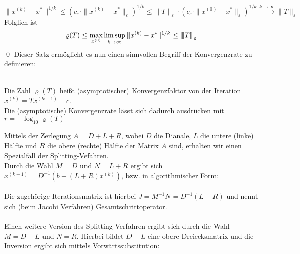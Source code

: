 \documentclass{article}
\begin{document}
\[\|x^{(k)}-x^*\|^{1/k}\leq\left(c_\varepsilon\cdot\|x^{(k)}-x^*\|_\varepsilon\right)^{1/k}
\leq \|T\|_\varepsilon\cdot\left(c_\varepsilon\cdot\|x^{(0)}-x^*\|_\varepsilon\right)^{1/k}
\xrightarrow{k\rightarrow\infty} \|T\|_\varepsilon\]
Folglich ist 
\[\varrho(T) \le \max_{x^{(0)}} \limsup_{k\rightarrow \infty} \|x^{(k)}-x^*\|^{1/k}\le {\left\vert\kern-0.25ex\left\vert\kern-0.25ex\left\vert T \right\vert\kern-0.25ex\right\vert\kern-0.25ex\right\vert}_\varepsilon\]
\qed
Dieser Satz ermöglicht es nun einen sinnvollen Begriff der Konvergenzrate zu definieren:
\begin{defbox} \\
    Die Zahl $\varrho(T)$ heißt (asymptotischer) Konvergenzfaktor von der Iteration $x^{(k)}=Tx^{(k-1)}+c$. \\
    Die (asymptotische) Konvergenzrate lässt sich dadurch ausdrücken mit $r=-\log_{10}\varrho(T)$
\end{defbox}
Mittels der Zerlegung $A=D+L+R$, wobei $D$ die Dianale, $L$ die untere (linke) Hälfte 
und $R$ die obere (rechte) Hälfte der Matrix $A$ sind, erhalten wir einen Spezialfall der Splitting-Vefahren. \\
Durch die Wahl $M=D$ und $N=L+R$ ergibt sich $x^{(k+1)}=D^{-1}(b - (L+R)x^{(k)})$, bzw. in algorithmischer Form:\\ \\
Die zugehörige Iterationsmatrix ist hierbei $J=M^{-1}N = D^{-1}(L+R)$ 
und nennt sich (beim Jacobi Verfahren) Gesamtschrittoperator. \\ \\
Einen weitere Version des Splitting-Verfahren ergibt sich durch die Wahl $M=D-L$ und $N=R$.
Hierbei bildet $D-L$ eine obere Dreiecksmatrix und die Inversion ergibt sich mittels Vorwärtssubstitution: \\ \\
\end{document}
